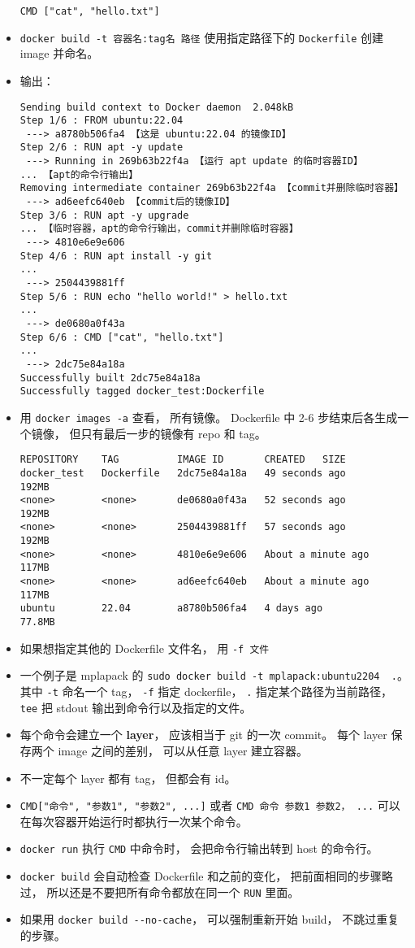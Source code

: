 \begin{itemize}
\begin{lstlisting}[language=none]
CMD ["cat", "hello.txt"]
\end{lstlisting}
\item \verb`docker build -t 容器名:tag名 路径` 使用指定路径下的 \verb`Dockerfile` 创建 image 并命名。
\item 输出：
\begin{lstlisting}[language=none]
Sending build context to Docker daemon  2.048kB
Step 1/6 : FROM ubuntu:22.04
 ---> a8780b506fa4 【这是 ubuntu:22.04 的镜像ID】
Step 2/6 : RUN apt -y update
 ---> Running in 269b63b22f4a 【运行 apt update 的临时容器ID】
... 【apt的命令行输出】
Removing intermediate container 269b63b22f4a 【commit并删除临时容器】
 ---> ad6eefc640eb 【commit后的镜像ID】
Step 3/6 : RUN apt -y upgrade
... 【临时容器，apt的命令行输出，commit并删除临时容器】
 ---> 4810e6e9e606
Step 4/6 : RUN apt install -y git
...
 ---> 2504439881ff
Step 5/6 : RUN echo "hello world!" > hello.txt
...
 ---> de0680a0f43a
Step 6/6 : CMD ["cat", "hello.txt"]
...
 ---> 2dc75e84a18a
Successfully built 2dc75e84a18a
Successfully tagged docker_test:Dockerfile
\end{lstlisting}
\item 用 \verb`docker images -a` 查看， 所有镜像。 Dockerfile 中 2-6 步结束后各生成一个镜像， 但只有最后一步的镜像有 repo 和 tag。
\begin{lstlisting}[language=none]
REPOSITORY    TAG          IMAGE ID       CREATED   SIZE
docker_test   Dockerfile   2dc75e84a18a   49 seconds ago       192MB
<none>        <none>       de0680a0f43a   52 seconds ago       192MB
<none>        <none>       2504439881ff   57 seconds ago       192MB
<none>        <none>       4810e6e9e606   About a minute ago   117MB
<none>        <none>       ad6eefc640eb   About a minute ago   117MB
ubuntu        22.04        a8780b506fa4   4 days ago           77.8MB
\end{lstlisting}
\item 如果想指定其他的 Dockerfile 文件名， 用 \verb`-f 文件`
\item 一个例子是 mplapack 的 \verb`sudo docker build -t mplapack:ubuntu2204  .`。 其中 \verb`-t` 命名一个 tag， \verb`-f` 指定 dockerfile， \verb`.` 指定某个路径为当前路径， \verb`tee` 把 stdout 输出到命令行以及指定的文件。
\item 每个命令会建立一个 \textbf{layer}， 应该相当于 git 的一次 commit。 每个 layer 保存两个 image 之间的差别， 可以从任意 layer 建立容器。
\item 不一定每个 layer 都有 tag， 但都会有 id。
\item \verb`CMD["命令", "参数1", "参数2", ...]` 或者 \verb`CMD 命令 参数1 参数2， ...` 可以在每次容器开始运行时都执行一次某个命令。
\item \verb`docker run` 执行 \verb`CMD` 中命令时， 会把命令行输出转到 host 的命令行。
\item \verb`docker build` 会自动检查 Dockerfile 和之前的变化， 把前面相同的步骤略过， 所以还是不要把所有命令都放在同一个 \verb`RUN` 里面。
\item 如果用 \verb`docker build --no-cache`， 可以强制重新开始 build， 不跳过重复的步骤。
\end{itemize}

